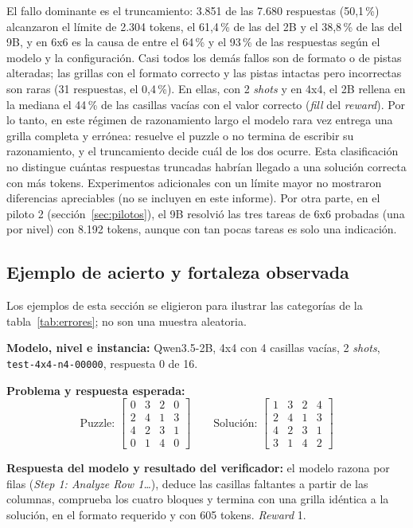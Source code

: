 El fallo dominante es el truncamiento: 3.851 de las 7.680 respuestas (50,1\,\%)
alcanzaron el límite de 2.304 tokens, el 61,4\,\% de las del 2B y el 38,8\,\% de
las del 9B, y en 6x6 es la causa de entre el 64\,\% y el 93\,\% de las respuestas
según el modelo y la configuración. Casi todos los demás fallos son de formato o
de pistas alteradas; las grillas con el formato correcto y las pistas intactas
pero incorrectas son raras (31 respuestas, el 0,4\,\%). En ellas, con 2 \emph{shots}
y en 4x4, el 2B rellena en la mediana el 44\,\% de las casillas vacías con el valor
correcto (\emph{fill} del \emph{reward}). Por lo tanto, en este régimen de
razonamiento largo el modelo rara vez entrega una grilla completa y errónea:
resuelve el puzzle o no termina de escribir su razonamiento, y el truncamiento
decide cuál de los dos ocurre. Esta clasificación no distingue cuántas respuestas
truncadas habrían llegado a una solución correcta con más tokens. Experimentos
adicionales con un límite mayor no mostraron diferencias apreciables (no se
incluyen en este informe). Por otra parte, en el piloto 2 (sección~\ref{sec:pilotos}), el 9B resolvió las tres tareas de 6x6
probadas (una por nivel) con 8.192 tokens, aunque con tan pocas tareas es solo
una indicación.

\subsection{Ejemplo de acierto y fortaleza observada}
Los ejemplos de esta sección se eligieron para ilustrar las categorías
de la tabla~\ref{tab:errores}; no son una muestra aleatoria.

\textbf{Modelo, nivel e instancia:} Qwen3.5-2B, 4x4 con 4 casillas vacías, 2
\emph{shots}, \texttt{test-4x4-n4-00000}, respuesta 0 de 16.

\textbf{Problema y respuesta esperada:}
\[
  \text{Puzzle: }
  \begin{bmatrix} 0&3&2&0\\ 2&4&1&3\\ 4&2&3&1\\ 0&1&4&0 \end{bmatrix}
  \qquad
  \text{Solución: }
  \begin{bmatrix} 1&3&2&4\\ 2&4&1&3\\ 4&2&3&1\\ 3&1&4&2 \end{bmatrix}
\]

\textbf{Respuesta del modelo y resultado del verificador:} el modelo razona por
filas (\emph{Step 1: Analyze Row 1\ldots}), deduce las casillas faltantes a partir
de las columnas, comprueba los cuatro bloques y termina con una grilla idéntica a
la solución, en el formato requerido y con 605 tokens. \emph{Reward} 1.

